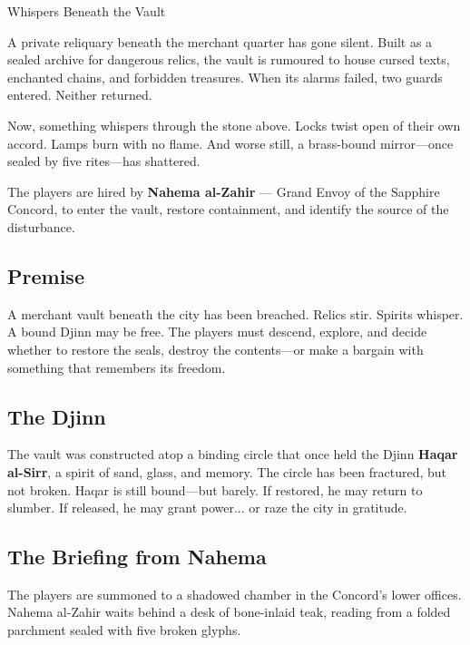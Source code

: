 

\begin{WyrdScenarioHeading}{Whispers Beneath the Vault}
	\label{scenario:whispers-beneath-the-vault}

	A private reliquary beneath the merchant quarter has gone silent. Built as a sealed archive for dangerous relics, the vault is rumoured to house cursed texts, enchanted chains, and forbidden treasures. When its alarms failed, two guards entered. Neither returned.

	Now, something whispers through the stone above. Locks twist open of their own accord. Lamps burn with no flame. And worse still, a brass-bound mirror—once sealed by five rites—has shattered.

	The players are hired by \textbf{Nahema al-Zahir} — Grand Envoy of the Sapphire Concord, to enter the vault, restore containment, and identify the source of the disturbance.

	\subsection*{Premise}
	A merchant vault beneath the city has been breached. Relics stir. Spirits whisper. A bound Djinn may be free. The players must descend, explore, and decide whether to restore the seals, destroy the contents—or make a bargain with something that remembers its freedom.

	\subsection*{The Djinn}
	The vault was constructed atop a binding circle that once held the Djinn \textbf{Haqar al-Sirr}, a spirit of sand, glass, and memory. The circle has been fractured, but not broken. Haqar is still bound—but barely. If restored, he may return to slumber. If released, he may grant power... or raze the city in gratitude.
\end{WyrdScenarioHeading}


\subsection*{The Briefing from Nahema}

The players are summoned to a shadowed chamber in the Concord’s lower offices. Nahema al-Zahir waits behind a desk of bone-inlaid teak, reading from a folded parchment sealed with five broken glyphs.

